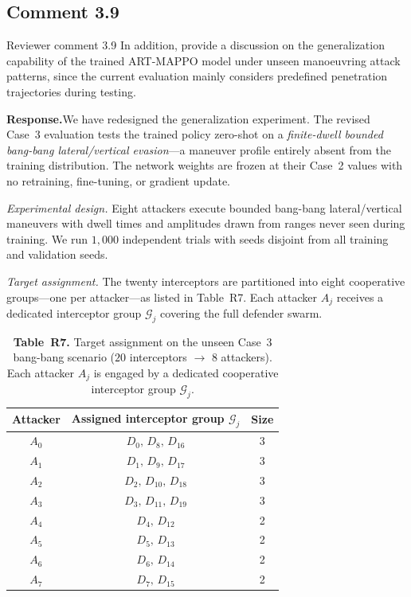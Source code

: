 \documentclass[11pt]{article}
\newcommand{\rsp}{\medskip\noindent\textbf{Response.}\quad}
\begin{document}
\clearpage

\subsection*{Comment 3.9 }

\begin{reviewercomment}{Reviewer comment 3.9}
In addition, provide a discussion on the generalization capability of the trained ART-MAPPO model
under unseen manoeuvring attack patterns, since the current evaluation mainly considers predefined
penetration trajectories during testing.
\end{reviewercomment}

\rsp We have redesigned the generalization experiment. The revised Case~3 evaluation tests
the trained policy zero-shot on a \emph{finite-dwell bounded bang-bang lateral/vertical evasion}---a
maneuver profile entirely absent from the training distribution. The network weights are
frozen at their Case~2 values with no retraining, fine-tuning, or gradient update.

\medskip\noindent\emph{Experimental design.}
Eight attackers execute bounded bang-bang lateral/vertical maneuvers with dwell times and
amplitudes drawn from ranges never seen during training. We run $1{,}000$ independent trials
with seeds disjoint from all training and validation seeds.

\medskip\noindent\emph{Target assignment.} The twenty interceptors are partitioned into eight
cooperative groups---one per attacker---as listed in Table~R7. Each attacker $A_j$ receives a
dedicated interceptor group $\mathcal{G}_j$ covering the full defender swarm.

\begin{table}[h]
\centering
\captionsetup{font=small}
\caption*{\small\textbf{Table~R7.} Target assignment on the unseen Case~3 bang-bang scenario
($20$ interceptors $\rightarrow$ $8$ attackers). Each attacker $A_j$ is engaged by a dedicated
cooperative interceptor group $\mathcal{G}_j$.}
\begin{tabular}{ccc}
\hline\hline
Attacker & Assigned interceptor group $\mathcal{G}_j$ & Size \\ \hline
$A_0$ & $D_0,\,D_8,\,D_{16}$   & 3 \\
$A_1$ & $D_1,\,D_9,\,D_{17}$   & 3 \\
$A_2$ & $D_2,\,D_{10},\,D_{18}$ & 3 \\
$A_3$ & $D_3,\,D_{11},\,D_{19}$ & 3 \\
$A_4$ & $D_4,\,D_{12}$         & 2 \\
$A_5$ & $D_5,\,D_{13}$         & 2 \\
$A_6$ & $D_6,\,D_{14}$         & 2 \\
$A_7$ & $D_7,\,D_{15}$         & 2 \\ \hline
\end{tabular}
\end{table}
\end{document}
